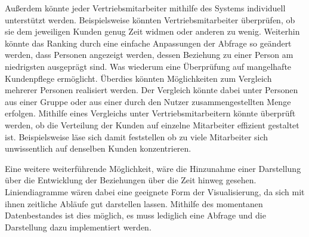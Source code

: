 Außerdem könnte jeder Vertriebsmitarbeiter mithilfe des Systems individuell unterstützt werden. Beispielsweise könnten Vertriebsmitarbeiter überprüfen, ob sie dem jeweiligen Kunden genug Zeit widmen oder anderen zu wenig. Weiterhin könnte das Ranking durch eine einfache Anpassungen der Abfrage so geändert werden, dass Personen angezeigt werden, dessen Beziehung zu einer Person am niedrigsten ausgeprägt sind. Was wiederum eine Überprüfung auf mangelhafte Kundenpflege ermöglicht. 
Überdies könnten Möglichkeiten zum Vergleich mehrerer Personen realisiert werden. Der Vergleich könnte dabei unter Personen aus einer Gruppe oder aus einer durch den Nutzer zusammengestellten Menge erfolgen. Mithilfe eines Vergleichs unter Vertriebsmitarbeitern könnte überprüft werden, ob die Verteilung der Kunden auf einzelne Mitarbeiter effizient gestaltet ist. Beispielsweise läse sich damit feststellen ob zu viele Mitarbeiter sich unwissentlich auf denselben Kunden konzentrieren.

Eine weitere weiterführende Möglichkeit, wäre die Hinzunahme einer Darstellung über die Entwicklung der Beziehungen über die Zeit hinweg gesehen. Liniendiagramme wären dabei eine geeignete Form der Visualisierung, da sich mit ihnen zeitliche Abläufe gut darstellen lassen. Mithilfe des momentanen Datenbestandes ist dies möglich, es muss lediglich eine Abfrage und die Darstellung dazu implementiert werden.  
